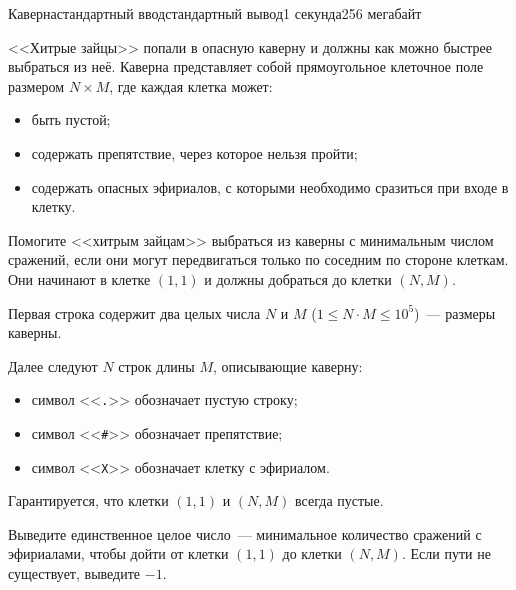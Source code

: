 \begin{problem}{Каверна}{стандартный ввод}{стандартный вывод}{1 секунда}{256 мегабайт}

<<Хитрые зайцы>> попали в опасную каверну и должны как можно быстрее выбраться из неё. Каверна представляет собой прямоугольное клеточное поле размером $N\times M$, где каждая клетка может:
\begin{itemize}
\item быть пустой;
\item содержать препятствие, через которое нельзя пройти;
\item содержать опасных эфириалов, с которыми необходимо сразиться при входе в клетку.
\end{itemize}

Помогите <<хитрым зайцам>> выбраться из каверны с минимальным числом сражений, если они могут передвигаться только по соседним по стороне клеткам. Они начинают в клетке $(1,1)$ и должны добраться до клетки $(N,M)$.

\InputFile
Первая строка содержит два целых числа $N$ и $M$ ($1\le N\cdot M\le10^5$)~--- размеры каверны.

Далее следуют $N$ строк длины $M$, описывающие каверну:
\begin{itemize}
\item символ <<\texttt{.}>> обозначает пустую строку;
\item символ <<\texttt{\#}>> обозначает препятствие;
\item символ <<\texttt{X}>> обозначает клетку с эфириалом.
\end{itemize}
Гарантируется, что клетки $(1,1)$ и $(N,M)$ всегда пустые.

\OutputFile
Выведите единственное целое число~--- минимальное количество сражений с эфириалами, чтобы дойти от клетки $(1,1)$ до клетки $(N,M)$. Если пути не существует, выведите $-1$.









\Examples

\begin{example}
%
%
%
\end{example}

\end{problem}

